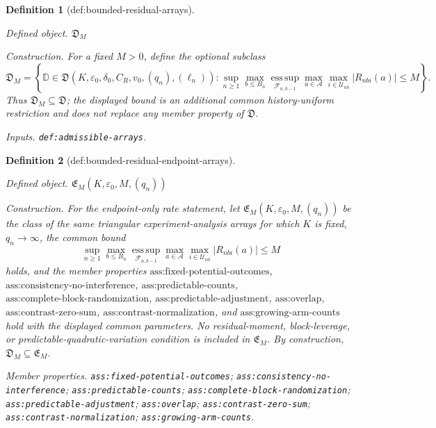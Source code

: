 \documentclass{article}
\newtheorem{definition}{Definition}
\begin{document}
\begin{definition}[def:bounded-residual-arrays]\label{def:bounded-residual-arrays}
\par\smallskip\noindent\emph{Defined object.} \(\mathfrak D_M\)
\par\smallskip\noindent\emph{Construction.} For a fixed \(M>0\), define the optional subclass
\[
\mathfrak D_M=\left\{\mathbb D\in\mathfrak D(K,\varepsilon_0,\delta_0,C_R,v_0,(q_n),(\ell_n)):
\sup_{n\ge1}\max_{b\le B_n}\operatorname*{ess\,sup}_{\mathcal F_{n,b-1}}
\max_{a\in\mathcal A}\max_{i\in\mathcal U_{nb}}|R_{nbi}(a)|\le M\right\}.
\]
Thus \(\mathfrak D_M\subseteq\mathfrak D\); the displayed bound is an additional common history-uniform restriction and does not replace any member property of \(\mathfrak D\).
\par\smallskip\noindent\emph{Inputs.} \texttt{def:\allowbreak{}admissible-\allowbreak{}arrays}.
\end{definition}

\begin{definition}[def:bounded-residual-endpoint-arrays]\label{def:bounded-residual-endpoint-arrays}
\par\smallskip\noindent\emph{Defined object.} \(\mathfrak E_M(K,\varepsilon_0,M,(q_n))\)
\par\smallskip\noindent\emph{Construction.} For the endpoint-only rate statement, let \(\mathfrak E_M(K,\varepsilon_0,M,(q_n))\) be the class of the same triangular experiment-analysis arrays for which \(K\) is fixed, \(q_n\to\infty\), the common bound
\[
\sup_{n\ge1}\max_{b\le B_n}\operatorname*{ess\,sup}_{\mathcal F_{n,b-1}}
\max_{a\in\mathcal A}\max_{i\in\mathcal U_{nb}}|R_{nbi}(a)|\le M
\]
holds, and the member properties \(\text{ass:fixed-potential-outcomes}\), \(\text{ass:consistency-no-interference}\), \(\text{ass:predictable-counts}\), \(\text{ass:complete-block-randomization}\), \(\text{ass:predictable-adjustment}\), \(\text{ass:overlap}\), \(\text{ass:contrast-zero-sum}\), \(\text{ass:contrast-normalization}\), and \(\text{ass:growing-arm-counts}\) hold with the displayed common parameters. No residual-moment, block-leverage, or predictable-quadratic-variation condition is included in \(\mathfrak E_M\). By construction, \(\mathfrak D_M\subseteq\mathfrak E_M\).
\par\smallskip\noindent\emph{Member properties.} \texttt{ass:\allowbreak{}fixed-\allowbreak{}potential-\allowbreak{}outcomes}; \texttt{ass:\allowbreak{}consistency-\allowbreak{}no-\allowbreak{}interference}; \texttt{ass:\allowbreak{}predictable-\allowbreak{}counts}; \texttt{ass:\allowbreak{}complete-\allowbreak{}block-\allowbreak{}randomization}; \texttt{ass:\allowbreak{}predictable-\allowbreak{}adjustment}; \texttt{ass:\allowbreak{}overlap}; \texttt{ass:\allowbreak{}contrast-\allowbreak{}zero-\allowbreak{}sum}; \texttt{ass:\allowbreak{}contrast-\allowbreak{}normalization}; \texttt{ass:\allowbreak{}growing-\allowbreak{}arm-\allowbreak{}counts}.
\end{definition}
\end{document}
